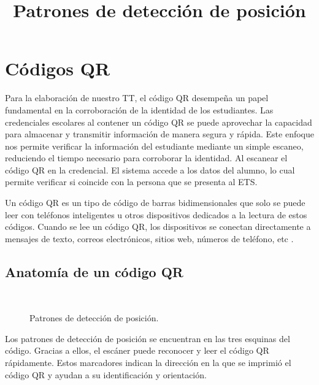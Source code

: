 
\section{Códigos QR}

Para la elaboración de nuestro TT, el código QR desempeña un papel fundamental en la corroboración de la identidad de los estudiantes. Las credenciales escolares al contener un código QR se puede aprovechar la capacidad para almacenar y transmitir información de manera segura y rápida. Este enfoque nos permite verificar la información del estudiante mediante un simple escaneo, reduciendo el tiempo necesario para corroborar la identidad. Al escanear el código QR en la credencial. El sistema accede a los datos del alumno, lo cual permite verificar si coincide con la persona que se presenta al ETS.

Un código QR es un tipo de código de barras bidimensionales que solo se puede leer con teléfonos inteligentes u otros dispositivos dedicados a la lectura de estos códigos. Cuando se lee un código QR, los dispositivos se conectan directamente a mensajes de texto, correos electrónicos, sitios web, números de teléfono, etc \cite{CitaA01}.

\subsection{Anatomía de un código QR}
\title{Patrones de detección de posición}\\

\begin{figure}[htbp]
	\begin{center}
		\caption{Patrones de detección de posición.}
		\label{fig:Patrones de deteccion de posicion2}
	\end{center}
\end{figure}

Los patrones de detección de posición se encuentran en las tres esquinas del código. Gracias a ellos, el escáner puede reconocer y leer el código QR rápidamente. Estos marcadores indican la dirección en la que se imprimió el código QR y ayudan a su identificación y orientación. \\


